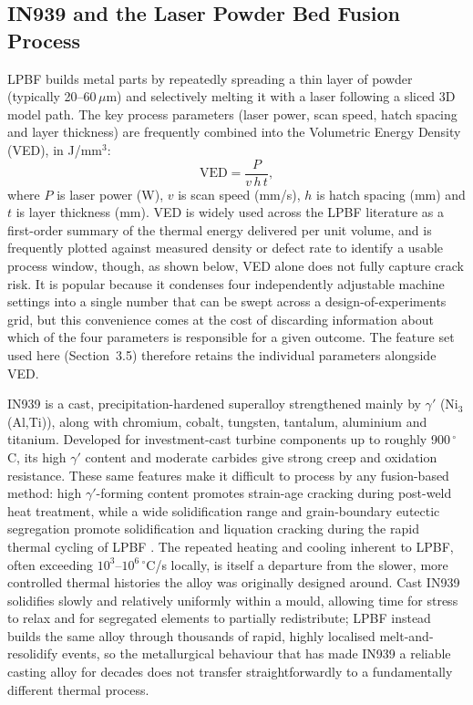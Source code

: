 \documentclass[a4paper]{article}
\begin{document}
\subsection{IN939 and the Laser Powder Bed Fusion Process}
LPBF builds metal parts by repeatedly spreading a thin layer of powder (typically 20--60\,$\mu$m) and selectively melting it with a laser following a sliced 3D model path. The key process parameters (laser power, scan speed, hatch spacing and layer thickness) are frequently combined into the Volumetric Energy Density (VED), in J/mm$^3$:
\begin{equation}
  \mathrm{VED} = \frac{P}{v\,h\,t},
\end{equation}
where $P$ is laser power (W), $v$ is scan speed (mm/s), $h$ is hatch spacing (mm) and $t$ is layer thickness (mm). VED is widely used across the LPBF literature as a first-order summary of the thermal energy delivered per unit volume, and is frequently plotted against measured density or defect rate to identify a usable process window, though, as shown below, VED alone does not fully capture crack risk. It is popular because it condenses four independently adjustable machine settings into a single number that can be swept across a design-of-experiments grid, but this convenience comes at the cost of discarding information about which of the four parameters is responsible for a given outcome. The feature set used here (Section~3.5) therefore retains the individual parameters alongside VED.

IN939 is a cast, precipitation-hardened superalloy strengthened mainly by $\gamma'$ (Ni$_3$(Al,Ti)), along with chromium, cobalt, tungsten, tantalum, aluminium and titanium. Developed for investment-cast turbine components up to roughly 900\,$^\circ$C, its high $\gamma'$ content and moderate carbides give strong creep and oxidation resistance. These same features make it difficult to process by any fusion-based method: high $\gamma'$-forming content promotes strain-age cracking during post-weld heat treatment, while a wide solidification range and grain-boundary eutectic segregation promote solidification and liquation cracking during the rapid thermal cycling of LPBF \citep{marchese2020,dogu2024}. The repeated heating and cooling inherent to LPBF, often exceeding $10^3$--$10^6$\,$^\circ$C/s locally, is itself a departure from the slower, more controlled thermal histories the alloy was originally designed around. Cast IN939 solidifies slowly and relatively uniformly within a mould, allowing time for stress to relax and for segregated elements to partially redistribute; LPBF instead builds the same alloy through thousands of rapid, highly localised melt-and-resolidify events, so the metallurgical behaviour that has made IN939 a reliable casting alloy for decades does not transfer straightforwardly to a fundamentally different thermal process.
\end{document}

